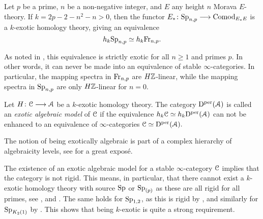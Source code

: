 \begin{example}
    \label{ch1:ex:chromatic-algebraicity}
    Let $p$ be a prime, $n$ be a non-negative integer, and $E$ any height $n$ Morava $E$-theory. If $k=2p-2-n^2-n>0$, then the functor $E_* \colon \mathrm{Sp}_{n,p}\longrightarrow \mathrm{Comod}_{E_*E}$ is a $k$-exotic homology theory, giving an equivalence 
    \[h_k \mathrm{Sp}_{n,p} \simeq h_k \mathrm{Fr}_{n,p}.\]
\end{example}

\begin{remark}
    As noted in \cite[5.29]{barthel-schlank-stapleton_2020}, this equivalence is strictly exotic for all $n\geq 1$ and primes $p$. In other words, it can never be made into an equivalence of stable $\infty$-categories. In particular, the mapping spectra in $\mathrm{Fr}_{n,p}$ are $H\mathbb{Z}$-linear, while the mapping spectra in $\mathrm{Sp}_{n,p}$ are only $H\mathbb{Z}$-linear for $n=0$. 
\end{remark}
    
\begin{definition}
    Let $H\colon \EuScript{C}\longrightarrow \EuScript{A}$ be a $k$-exotic homology theory. The category $\mathrm{D}^{\mathrm{per}}(\EuScript{A})$ is called an \emph{exotic algebraic model} of $\EuScript{C}$ if the equivalence $h_k \EuScript{C} \simeq h_k \mathrm{D}^{\mathrm{per}}(\EuScript{A})$ can not be enhanced to an equivalence of $\infty$-categories $\EuScript{C}\simeq \mathrm{D}^{\mathrm{per}}(\EuScript{A}).$
\end{definition}

\begin{remark}
    The notion of being exotically algebraic is part of a complex hierarchy of algebraicity levels, see \cite{ishak-roitzheim-williamson_2023} for a great exposé. 
\end{remark}
    
\begin{remark}
    The existence of an exotic algebraic model for a stable $\infty$-category $\EuScript{C}$ implies that the category is not rigid. This means, in particular, that there cannot exist a $k$-exotic homology theory with source $\mathrm{Sp}$ or $\mathrm{Sp}_{(p)}$ as these are all rigid for all primes, see \cite{schwede_07}, \cite{schwede-schipley_02} and \cite{schwede_01}. The same holds for $\mathrm{Sp}_{1,2}$, as this is rigid by \cite{roitzheim_07}, and similarly for $\mathrm{Sp}_{K_2(1)}$ by \cite{ishak_19}. This shows that being $k$-exotic is quite a strong requirement. 
\end{remark}








